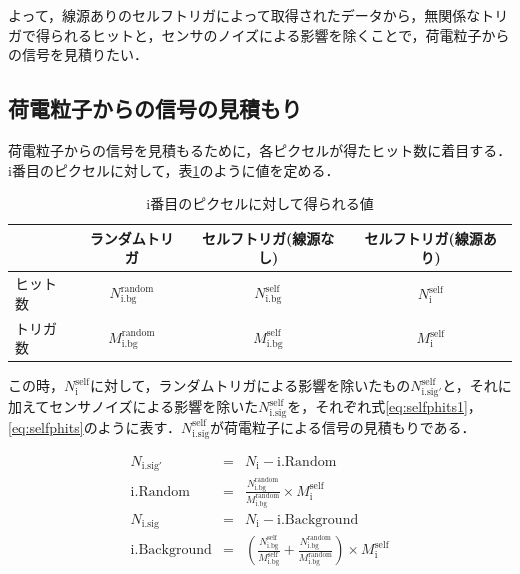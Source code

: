 よって，線源ありのセルフトリガによって取得されたデータから，無関係なトリガで得られるヒットと，センサのノイズによる影響を除くことで，荷電粒子からの信号を見積りたい．

\subsection*{荷電粒子からの信号の見積もり}
荷電粒子からの信号を見積もるために，各ピクセルが得たヒット数に着目する．i番目のピクセルに対して，表\ref{tab:selfpara}のように値を定める．
  \begin{table}[h]
    \centering
    \caption{i番目のピクセルに対して得られる値}
    \begin{tabular} {l|ccc} \hline
      & ランダムトリガ & セルフトリガ(線源なし) & セルフトリガ(線源あり) \\ \hline \hline
      ヒット数 & $N_{\mathrm{i.bg}}^{\mathrm{random}}$& $N_{\mathrm{i.bg}}^{\mathrm{self}}$ & $N_{\mathrm{i}}^{\mathrm{self}}$ \\
      トリガ数 & $M_{\mathrm{i.bg}}^{\mathrm{random}}$ & $M_{\mathrm{i.bg}}^{\mathrm{self}}$& $M_{\mathrm{i}}^{\mathrm{self}}$\\ \hline
    \end{tabular}
    \label{tab:selfpara}
  \end{table}


この時，$N_{\mathrm{i}}^{\mathrm{self}}$に対して，ランダムトリガによる影響を除いたもの$N_{\mathrm{i.sig'}}^{\mathrm{self}}$と，それに加えてセンサノイズによる影響を除いた$N_{\mathrm{i.sig}}^{\mathrm{self}}$を，それぞれ式\ref{eq:selfphits1}，\ref{eq:selfphits}のように表す．$N_{\mathrm{i.sig}}^{\mathrm{self}}$が荷電粒子による信号の見積もりである．
  
\begin{eqnarray}
  \label{eq:selfphits1}
  N_{\mathrm{i.sig'}} &=& N_{\mathrm{i}} - \mathrm{i.Random} \\
  \mathrm{i.Random} &=& \frac{N_{\mathrm{i.bg}}^{\mathrm{random}}}{M_{\mathrm{i.bg}}^{\mathrm{random}}} \times M_{\mathrm{i}}^{\mathrm{self}}\\ \nonumber
  \label{eq:selfphits}
  N_{\mathrm{i.sig}} &=& N_{\mathrm{i}} - \mathrm{i.Background} \\
  \mathrm{i.Background} &=& \left(\frac{N_{\mathrm{i.bg}}^{\mathrm{self}}}{M_{\mathrm{i.bg}}^{\mathrm{self}}} + \frac{N_{\mathrm{i.bg}}^{\mathrm{random}}}{M_{\mathrm{i.bg}}^{\mathrm{random}}} \right) \times M_{\mathrm{i}}^{\mathrm{self}} \nonumber
\end{eqnarray}

